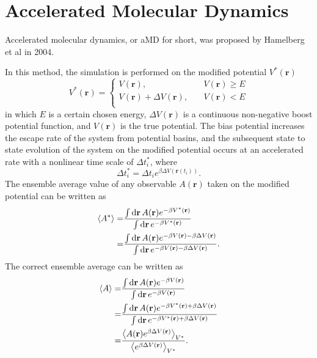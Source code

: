 \section{Accelerated Molecular Dynamics\label{Sec:ES:aMD}}
Accelerated molecular dynamics, or aMD for short, was proposed by Hamelberg et al in 2004.\cite{HamelbergJCP2004}

In this method, the simulation is performed on the modified potential $V^\ast(\mathbf{r})$
\begin{equation}
	V^\ast(\mathbf{r})= 
	\left\{ 
	\begin{array}{rl} 
		V(\mathbf{r}), &\quad V(\mathbf{r})\geq E\\ 
		V(\mathbf{r})+\Delta V(\mathbf{r}), &\quad V(\mathbf{r})< E\\  
	\end{array} 
	\right.
\end{equation}
in which $E$ is a certain chosen energy, $\Delta V(\mathbf{r})$ is a continuous non-negative boost potential function, and $V(\mathbf{r})$ is the true potential. The bias potential increases the escape rate of the system from potential basins, and the subsequent state to state evolution of the system on the modified potential occurs at an accelerated rate with a nonlinear time scale of $\Delta t^\ast_i$, where
\begin{equation}
	\Delta t^\ast_i=\Delta t_i e^{\beta \Delta V(\mathbf{r}(t_i))}.
\end{equation}
The ensemble average value of any observable $A(\mathbf{r})$ taken on the modified potential can be written as
\begin{align}
	\left<A^\ast\right>=&\frac{\int \mathop{}\!\mathrm{d} \mathbf{r}\,A(\mathbf{r})e^{-\beta V^{\ast}(\mathbf{r})}}{\int \mathop{}\!\mathrm{d} \mathbf{r}\, e^{-\beta V^{\ast}(\mathbf{r})}}\notag\\
	        =&\frac{\int \mathop{}\!\mathrm{d} \mathbf{r}\,A(\mathbf{r})e^{-\beta V(\mathbf{r})-\beta \Delta V(\mathbf{r})}}{\int \mathop{}\!\mathrm{d} \mathbf{r}\, e^{-\beta V(\mathbf{r})-\beta \Delta V(\mathbf{r})}}.
\end{align}
The correct ensemble average can be written as
\begin{align}
	\left<A\right>=&\frac{\int \mathop{}\!\mathrm{d} \mathbf{r}\,A(\mathbf{r})e^{-\beta V(\mathbf{r})}}{\int \mathop{}\!\mathrm{d} \mathbf{r}\, e^{-\beta V(\mathbf{r})}}\notag\\
	=&\frac{\int \mathop{}\!\mathrm{d} \mathbf{r}\,A(\mathbf{r})e^{-\beta V^\ast(\mathbf{r})+\beta \Delta V(\mathbf{r})}}{\int \mathop{}\!\mathrm{d} \mathbf{r}\, e^{-\beta V^\ast(\mathbf{r})+\beta \Delta V(\mathbf{r})}}\notag\\
	=&\frac{\left<A(\mathbf{r})e^{\beta \Delta V(\mathbf{r})}\right>_{V^\ast}}{\left<e^{\beta \Delta V(\mathbf{r}) }\right>_{V^\ast}}.
\end{align}
